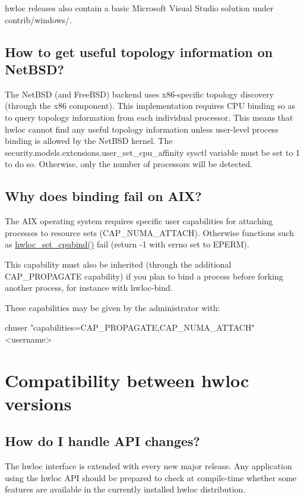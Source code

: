 hwloc releases also contain a basic Microsoft Visual Studio solution under {\ttfamily contrib/windows/}.\hypertarget{a00394_faq_netbsd_bind}{}\subsection{How to get useful topology information on Net\+B\+S\+D?}\label{a00394_faq_netbsd_bind}
The Net\+B\+SD (and Free\+B\+SD) backend uses x86-\/specific topology discovery (through the x86 component). This implementation requires C\+PU binding so as to query topology information from each individual processor. This means that hwloc cannot find any useful topology information unless user-\/level process binding is allowed by the Net\+B\+SD kernel. The {\ttfamily security.\+models.\+extensions.\+user\+\_\+set\+\_\+cpu\+\_\+affinity} sysctl variable must be set to 1 to do so. Otherwise, only the number of processors will be detected.\hypertarget{a00394_faq_aix_bind}{}\subsection{Why does binding fail on A\+I\+X?}\label{a00394_faq_aix_bind}
The A\+IX operating system requires specific user capabilities for attaching processes to resource sets (C\+A\+P\+\_\+\+N\+U\+M\+A\+\_\+\+A\+T\+T\+A\+CH). Otherwise functions such as \hyperlink{a00190_ga80bc07473a8edf840cae17bd7ec21d48}{hwloc\+\_\+set\+\_\+cpubind()} fail (return -\/1 with errno set to E\+P\+E\+RM).

This capability must also be inherited (through the additional C\+A\+P\+\_\+\+P\+R\+O\+P\+A\+G\+A\+TE capability) if you plan to bind a process before forking another process, for instance with {\ttfamily hwloc-\/bind}.

These capabilities may be given by the administrator with\+: \begin{DoxyVerb}chuser "capabilities=CAP_PROPAGATE,CAP_NUMA_ATTACH" <username>
\end{DoxyVerb}


 \hypertarget{a00394_faq5}{}\section{Compatibility between hwloc versions}\label{a00394_faq5}
\hypertarget{a00394_faq_version_api}{}\subsection{How do I handle A\+P\+I changes?}\label{a00394_faq_version_api}
The hwloc interface is extended with every new major release. Any application using the hwloc A\+PI should be prepared to check at compile-\/time whether some features are available in the currently installed hwloc distribution.

